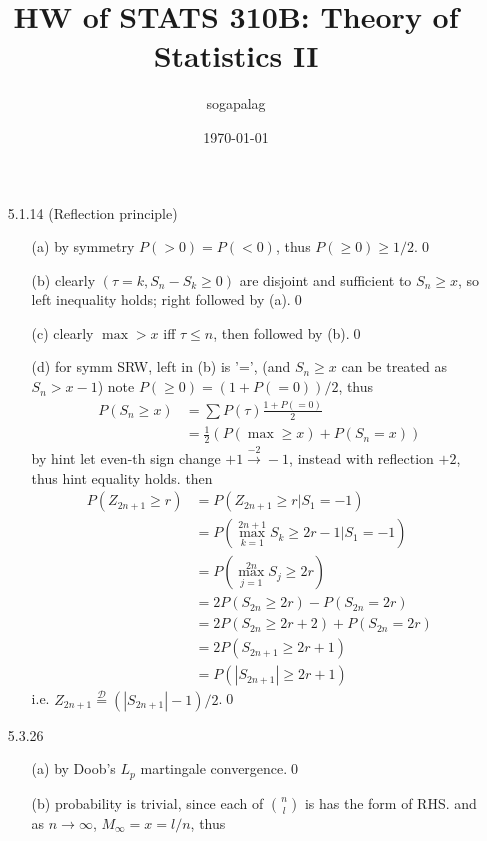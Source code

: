\documentclass[paper=a4, fontsize=11pt]{scrartcl} %
\title{HW of STATS 310B: Theory of Statistics II}
\author{sogapalag}
\date{\normalsize\today}
\numberwithin{equation}{section} %
\numberwithin{figure}{section} %
\numberwithin{table}{section} %
\begin{document}
\maketitle

\begin{itemize}
	\item[5.1.14](Reflection principle)
	\begin{itemize}
		\item[(a)] by symmetry $P(>0)=P(<0)$, thus $P(\geq 0)\geq 1/2$.\qed
		\item[(b)] clearly $(\tau=k, S_n-S_k\geq 0)$ are disjoint and sufficient to $S_n\geq x$, so left inequality holds; right followed by (a).\qed
		\item[(c)] clearly $\max>x$ iff $\tau\leq n$, then followed by (b).\qed
		\item[(d)] for symm SRW, left in (b) is '=', (and $S_n\geq x$ can be treated as $S_n>x-1$) note $P(\geq 0)=(1+P(=0))/2$, thus
		\begin{align}
			P(S_n\geq x) &= \sum P(\tau) \frac{1+P(=0)}{2}\\
				&= \frac{1}{2}(P(\max\geq x)+ P(S_n=x))
		\end{align}
		by hint let even-th sign change $+1\stackrel{-2}\rightarrow -1$, instead with reflection $+2$, thus hint equality holds. then 
		\begin{align}
			P(Z_{2n+1}\geq r) &= P(Z_{2n+1}\geq r | S_1=-1)\\
				&= P(\max_{k=1}^{2n+1} S_k\geq 2r-1|S_1=-1)\\
				&= P(\max_{j=1}^{2n} S_j\geq 2r)\\
				&= 2P(S_{2n}\geq 2r) - P(S_{2n}=2r)\\
				&= 2P(S_{2n}\geq 2r+2)+ P(S_{2n}=2r)\\
				&= 2P(S_{2n+1}\geq 2r+1)\\
				&= P(|S_{2n+1}|\geq 2r+1)
		\end{align}
		i.e. $Z_{2n+1}\stackrel{\mathcal{D}}{=} (|S_{2n+1}|-1)/2$.\qed
	\end{itemize}
	\item[5.3.26]
	\begin{itemize}
		\item[(a)] by Doob's $L_p$ martingale convergence.\qed
		\item[(b)] probability is trivial, since each of ${n \choose l}$ is has the form of RHS. and as $n\rightarrow \infty$, $M_\infty= x=l/n$, thus

\end{itemize}
\end{itemize}
\end{document}

